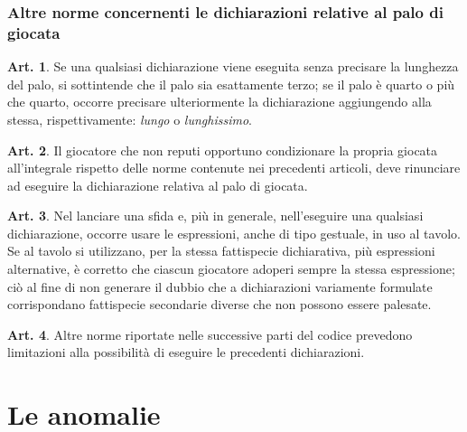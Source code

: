 \documentclass[italian,a4paper]{book}
\theoremstyle{definition}
\newtheorem{art}{Art.}
\begin{document}
\subsubsection{Altre norme concernenti le dichiarazioni relative al palo di
giocata}
\begin{art}
    Se una qualsiasi dichiarazione viene eseguita senza precisare la lunghezza del palo, si sottintende che il palo sia esattamente terzo; se il palo è quarto o più che quarto, occorre precisare ulteriormente la dichiarazione aggiungendo alla stessa, rispettivamente: \emph{lungo} o  \emph{lunghissimo}.
\end{art}
\begin{art}
    Il giocatore che non reputi opportuno condizionare la propria giocata all'integrale rispetto delle norme contenute nei precedenti articoli, deve  rinunciare ad eseguire la dichiarazione relativa al palo di giocata.
\end{art}
\begin{art}
    Nel lanciare una sfida e, più in generale, nell'eseguire una qualsiasi dichiarazione, occorre usare le espressioni, anche di tipo gestuale, in uso al tavolo.
    Se al tavolo si utilizzano, per la stessa fattispecie dichiarativa, più espressioni alternative, è corretto che ciascun giocatore adoperi sempre la stessa espressione; ciò al fine di non generare il dubbio che a dichiarazioni variamente formulate corrispondano fattispecie secondarie diverse che non possono essere palesate.
\end{art}
\begin{art}\label{fine.dich}
    Altre norme riportate nelle successive parti del codice prevedono limitazioni alla possibilità di eseguire le precedenti dichiarazioni.
\end{art}
\section{Le anomalie}
\end{document}

